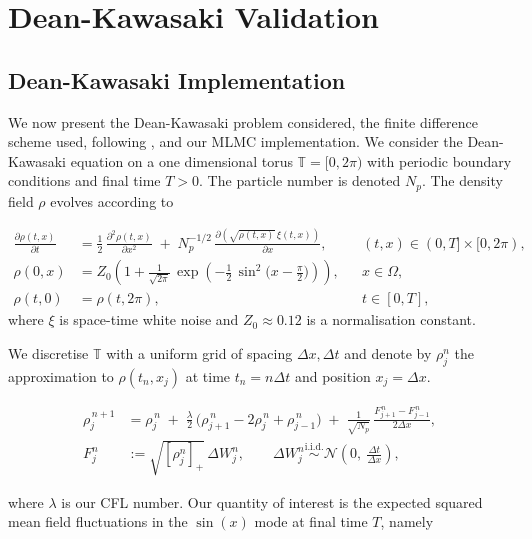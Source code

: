\section{Dean-Kawasaki Validation}\label{sec:dk_validation}

\subsection{Dean-Kawasaki Implementation}\label{sec:dk_implementation} 
We now present the Dean-Kawasaki problem considered, the finite difference scheme
used,
following \cite{cornalba2025multilevel}, and our MLMC 
implementation.
We consider the Dean-Kawasaki equation on a one dimensional torus
$\mathbb{T}=[0,2\pi)$ with periodic boundary conditions and final time $T>0$.
The particle number is denoted $N_p$. The density 
field $\rho$ evolves according to

\begin{align}
\frac{\partial \rho(t,x)}{\partial t}
&= \frac{1}{2}\,\frac{\partial^2 \rho(t,x)}{\partial x^2}
\;+\; N_p^{-1/2}\,\frac{\partial \!\left(\sqrt{\rho(t,x)}\,\xi(t,x)\right)}{\partial x},
&& (t,x)\in (0,T]\times [0, 2\pi),
\label{eq:dk_spde_problem}\\[4pt]
\rho(0,x)
&= Z_0\!\left(1+\frac{1}{\sqrt{2\pi}}
\,\exp\!\left(-\tfrac{1}{2}\,\sin^2\!\big(x-\tfrac{\pi}{2}\big)\right)\right),
&& x\in\Omega, \nonumber\\
\rho(t,0) &= \rho(t,2\pi), &&t \in [0,T], \nonumber
\end{align}
where $\xi$ is space-time white noise and $Z_0 \approx 
0.12$ is a normalisation constant.

We discretise $\mathbb{T}$ with a uniform grid of spacing 
$\Delta x, \Delta t$ and denote by $\rho_j^n$ the approximation
to $\rho(t_n, x_j)$ at time $t_n = n \Delta t$ and position $x_j = 
\Delta x$.

\begin{align}
\rho_j^{\,n+1}
&= \rho_j^{\,n}
\;+\; \tfrac{\lambda}{2}\,\bigl(\rho_{j+1}^{\,n}-2\rho_j^{\,n}+\rho_{j-1}^{\,n}\bigr)
\;+\; \tfrac{1}{\sqrt{N_p}}\,
\frac{F_{j+1}^{\,n}-F_{j-1}^{\,n}}{2\Delta x}, \label{eq:dk_fd}\\[4pt]
F_j^n &:= \sqrt{[\rho_j^n]_+}\,\Delta W_j^n, \qquad
\Delta W_j^n \overset{\text{i.i.d.}}{\sim} \mathcal{N}\!\left(0,\ \tfrac{\Delta t}{\Delta x}\right),
\nonumber
\end{align}

where $\lambda$ is our CFL number.
Our quantity of interest is the expected squared mean field fluctuations
in the $\sin(x)$ mode at final time $T$, namely

